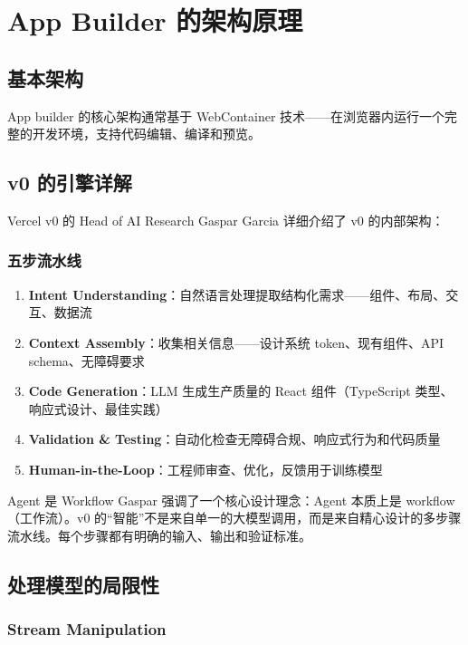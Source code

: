 \section{App Builder 的架构原理}

\subsection{基本架构}

App builder 的核心架构通常基于 WebContainer 技术——在浏览器内运行一个完整的开发环境，支持代码编辑、编译和预览。

\subsection{v0 的引擎详解}

Vercel v0 的 Head of AI Research Gaspar Garcia 详细介绍了 v0 的内部架构：

\subsubsection{五步流水线}

\begin{enumerate}
    \item \textbf{Intent Understanding}：自然语言处理提取结构化需求——组件、布局、交互、数据流
    \item \textbf{Context Assembly}：收集相关信息——设计系统 token、现有组件、API schema、无障碍要求
    \item \textbf{Code Generation}：LLM 生成生产质量的 React 组件（TypeScript 类型、响应式设计、最佳实践）
    \item \textbf{Validation \& Testing}：自动化检查无障碍合规、响应式行为和代码质量
    \item \textbf{Human-in-the-Loop}：工程师审查、优化，反馈用于训练模型
\end{enumerate}

\begin{importantbox}{Agent 是 Workflow}
Gaspar 强调了一个核心设计理念：Agent 本质上是 workflow（工作流）。v0 的``智能''不是来自单一的大模型调用，而是来自精心设计的多步骤流水线。每个步骤都有明确的输入、输出和验证标准。
\end{importantbox}

\subsection{处理模型的局限性}

\subsubsection{Stream Manipulation}

